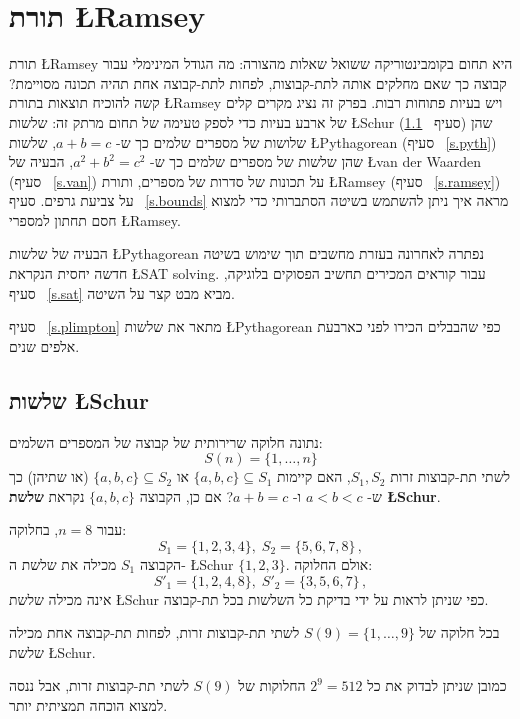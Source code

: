 

\chapter[תורת
\L{\normalsize Ramsey}]{תורת
\L{\Large Ramsey}}\label{c.ramsey}

תורת 
\L{Ramsey}
היא תחום בקומבינטוריקה ששואל שאלות מהצורה: מה הגודל המינימלי עבור קבוצה כך שאם מחלקים אותה לתת-קבוצות, לפחות לתת-קבוצה אחת תהיה תכונה מסויימת? קשה להוכיח תוצאות בתורת 
\L{Ramsey}
ויש בעיות פתוחות רבות. בפרק זה נציג מקרים קלים של ארבע בעיות כדי לספק טעימה של תחום מרתק זה: שלשות
\L{Schur}
(סעיף%
~\ref{s.schur})
שהן שלושות של מספרים שלמים כך ש-%
$a+b=c$,
שלשות
\L{Pythagorean}
(סעיף%
~\ref{s.pyth})
שהן שלשות של מספרים שלמים כך ש-%
$a^2+b^2=c^2$,
הבעיה של
\L{van der Waarden}
(סעיף%
~\ref{s.van})
על תכונות של סדרות של מספרים, ותורת
\L{Ramsey}
(סעיף%
~\ref{s.ramsey})
על צביעת גרפים. סעיף%
~\ref{s.bounds}
מראה איך ניתן להשתמש בשיטה הסתברותי כדי למצוא חסם תחתון למספרי
\L{Ramsey}.

הבעיה של שלשות
\L{Pythagorean}
נפתרה לאחרונה בעזרת מחשבים תוך שימוש בשיטה חדשה יחסית הנקראת 
\L{SAT solving}.
עבור קוראים המכירים תחשיב הפסוקים בלוגיקה, סעיף%
~\ref{s.sat}
מביא מבט קצר על השיטה.

סעיף%
~\ref{s.plimpton}
מתאר את שלשות 
\L{Pythagorean}
כפי שהבבלים הכירו לפני כארבעת אלפים שנים.


\section{שלשות
\L{\normalsize Schur}}\label{s.schur}

\begin{definition}
נתונה חלוקה שרירותית של קבוצה של המספרים השלמים:
\[
S(n)=\{1,\ldots,n\}
\]
לשתי תת-קבוצות זרות
$S_1,S_2$,
האם קיימות
$\{a,b,c\}\subseteq S_1$
או
$\{a,b,c\}\subseteq S_2$
(או שתיהן) כך ש-%
$a\!<\!b\!<\!c$
ו-%
$a+b=c$?
אם כן, הקבוצה 
$\{a,b,c\}$
נקראת 
\textbf{שלשת \L{Schur}}.
\end{definition}

\begin{example}
עבור
$n=8$,
בחלוקה:
\begin{equation}
S_1 = \{1,2,3,4\},\; S_2 = \{5,6,7,8\}\,,
\label{eq.schur0}
\end{equation}
הקבוצה
$S_1$
מכילה את שלשת ה-%
\L{Schur}
$\{1,2,3\}$.
אולם החלוקה:
\begin{equation}
S'_1 = \{1,2,4,8\},\; S'_2 = \{3,5,6,7\}\,,
\label{eq:schur1}
\end{equation}
אינה מכילה שלשת
\L{Schur}
כפי שניתן לראות על ידי בדיקת כל השלשות בכל תת-קבוצה.
\end{example}
\begin{theorem}
בכל חלוקה של
$S(9)=\{1,\ldots,9\}$
לשתי תת-קבוצות זרות, לפחות תת-קבוצה אחת מכילה שלשת
\L{Schur}.
\end{theorem}
כמובן שניתן לבדוק את כל
$2^9=512$
החלוקות של 
$S(9)$
לשתי תת-קבוצות זרות, אבל ננסה למצוא הוכחה תמציתית יותר.


